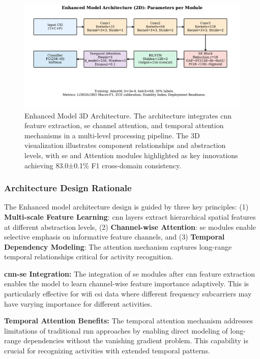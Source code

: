 \documentclass[journal]{IEEEtran}
\begin{document}
\begin{figure}[ht]
\centering
\includegraphics[width=\columnwidth]{figures/fig3_enhanced_model_dataflow.pdf}%
\caption{Enhanced Model 3D Architecture. The architecture integrates \gls{cnn} feature extraction, \gls{se} channel attention, and temporal attention mechanisms in a multi-level processing pipeline. The 3D visualization illustrates component relationships and abstraction levels, with \gls{se} and Attention modules highlighted as key innovations achieving 83.0±0.1\% F1 cross-domain consistency.}
\label{fig:enhanced_3d_arch}
\end{figure}

\subsubsection{Architecture Design Rationale}

The Enhanced model architecture design is guided by three key principles: (1) \textbf{Multi-scale Feature Learning}: \gls{cnn} layers extract hierarchical spatial features at different abstraction levels, (2) \textbf{Channel-wise Attention}: \gls{se} modules enable selective emphasis on informative feature channels, and (3) \textbf{Temporal Dependency Modeling}: The attention mechanism captures long-range temporal relationships critical for activity recognition.

\textbf{\gls{cnn}-\gls{se} Integration:} The integration of \gls{se} modules after \gls{cnn} feature extraction enables the model to learn channel-wise feature importance adaptively. This is particularly effective for \gls{wifi} \gls{csi} data where different frequency subcarriers may have varying importance for different activities.

\textbf{Temporal Attention Benefits:} The temporal attention mechanism addresses limitations of traditional \gls{rnn} approaches by enabling direct modeling of long-range dependencies without the vanishing gradient problem. This capability is crucial for recognizing activities with extended temporal patterns.
\end{document}
